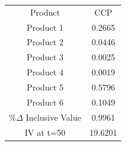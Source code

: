 \begin{tabular}{cc}
Product & CCP \\
Product 1 & 0.2665 \\
Product 2 & 0.0446 \\
Product 3 & 0.0025 \\
Product 4 & 0.0019 \\
Product 5 & 0.5796 \\
Product 6 & 0.1049 \\
$\%\Delta$ Inclusive Value & 0.9961 \\
IV at t=50 & 19.6201 \\
\end{tabular}